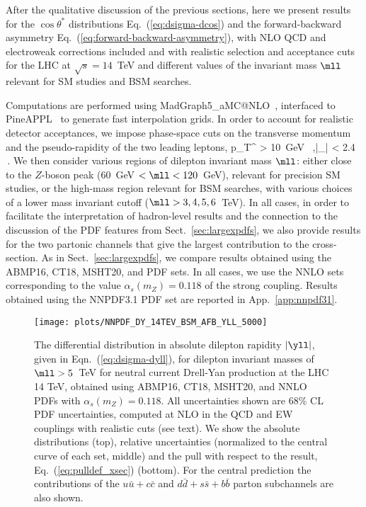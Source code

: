 
After the qualitative discussion of the previous sections, here we
present results for the $\cos\theta^*$
distributions Eq.~(\ref{eq:dsigma-dcos}) and the
forward-backward asymmetry Eq.~(\ref{eq:forward-backward-asymmetry}), with
NLO QCD and electroweak corrections included and
with realistic selection and acceptance cuts for the LHC at $\sqrt{s} = 14$~TeV
and different values of the invariant mass $\mll$ relevant for SM
studies and BSM searches.

Computations are performed using {\sc\small MadGraph5\_aMC@NLO}~\cite{Alwall:2014hca},
interfaced to {\sc\small PineAPPL}~\cite{Carrazza:2020gss,christopher_schwan_2022_7023438} to generate
fast interpolation grids.
%
In order to account for realistic detector acceptances,
we impose phase-space cuts on the transverse momentum and the pseudo-rapidity of the two
leading leptons,
\be
p_T^{\ell} > 10~{\rm GeV}  \, ,\qquad |\eta_{\ell}| < 2.4 \,.
\ee
We then consider various regions of dilepton invariant mass $\mll$:
either close to the $Z$-boson peak ($60$~GeV $< \mll < 120$~GeV),
relevant for precision SM studies, or the
high-mass region relevant for BSM searches, with  various choices of a
lower mass invariant cutoff ($\mll > 3,4,5,6$~TeV).
%
In all cases, in order to facilitate the interpretation of
hadron-level results  and the connection to
the discussion of the PDF features from Sect.~\ref{sec:largexpdfs},
we also provide results for the two partonic channels that give the
largest contribution to the cross-section.
%
As in Sect.~\ref{sec:largexpdfs}, we compare results obtained using
the  ABMP16, CT18, MSHT20, and  PDF sets.
%
In all cases, we
use the  NNLO sets corresponding to the value $\alpha_s(m_Z)=0.118$
of the strong coupling.
%
Results obtained using the NNPDF3.1 PDF set are reported in App.~\ref{app:nnpdf31}.

\begin{figure}[!t]
 \centering
 \texttt{[image: plots/NNPDF\_DY\_14TEV\_BSM\_AFB\_YLL\_5000]}
 \caption{The differential distribution in absolute dilepton rapidity $|\yll|$, given in
Eqn.~(\ref{eq:dsigma-dyll}),
for dilepton invariant masses of $\mll > 5$~TeV
for neutral current Drell-Yan production at the
LHC 14 TeV,
obtained using ABMP16, CT18, MSHT20, and  NNLO PDFs with $\alpha_s(m_Z)=0.118$.
%
All
uncertainties shown are 68\% CL PDF uncertainties, computed at NLO
in the QCD and EW couplings with realistic cuts (see text).
We show the absolute distributions (top), relative uncertainties (normalized
to the central curve of each set, middle) and the pull with respect to the
 result, Eq.~(\ref{eq:pulldef_xsec}) (bottom).
%
For the central  prediction
the contributions of the $u\bar{u}+c\bar{c}$ and $d\bar{d}+s\bar{s}+b\bar{b}$
parton subchannels are also shown.
 \label{fig:CMS_DY_14TEV_MLL_5000_rap}}
\end{figure}

